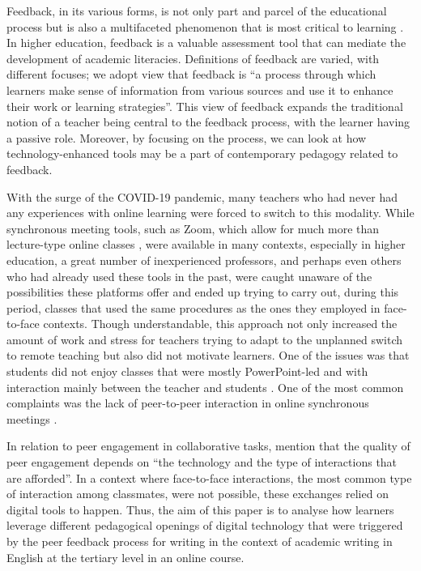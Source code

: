 \documentclass[english]{textolivre}
\begin{document}
Feedback, in its various forms, is not only part and parcel of the educational process but is also a multifaceted phenomenon that is most critical to learning \cite{hattie2007power}. In higher education, feedback is a valuable assessment tool that can mediate the development of academic literacies. Definitions of feedback are varied, with different focuses; we adopt \textcite[p. 1315]{carless2018development} view that feedback is “a process through which learners make sense of information from various sources and use it to enhance their work or learning strategies”. This view of feedback expands the traditional notion of a teacher being central to the feedback process, with the learner having a passive role. Moreover, by focusing on the process, we can look at how technology-enhanced tools may be a part of contemporary pedagogy related to feedback.

With the surge of the COVID-19 pandemic, many teachers who had never had any experiences with online learning were forced to switch to this modality. While synchronous meeting tools, such as Zoom, which allow for much more than lecture-type online classes \cite{kohnke2022facilitating}, were available in many contexts, especially in higher education, a great number of inexperienced professors, and perhaps even others who had already used these tools in the past, were caught unaware of the possibilities these platforms offer and ended up trying to carry out, during this period, classes that used the same procedures as the ones they employed in face-to-face contexts. Though understandable, this approach not only increased the amount of work and stress for teachers trying to adapt to the unplanned switch to remote teaching \cite{silus2020desafios} but also did not motivate learners. One of the issues was that students did not enjoy classes that were mostly PowerPoint-led and with interaction mainly between the teacher and students \cite{belda2021enhancing}. One of the most common complaints was the lack of peer-to-peer interaction in online synchronous meetings \cite{belda2021enhancing, co2020ensino}.

In relation to peer engagement in collaborative tasks, \textcite[p. 36]{willis2013sociocultural} mention that the quality of peer engagement depends on “the technology and the type of interactions that are afforded”. In a context where face-to-face interactions, the most common type of interaction among classmates, were not possible, these exchanges relied on digital tools to happen. Thus, the aim of this paper is to analyse how learners leverage different pedagogical openings of digital technology that were triggered by the peer feedback process for writing in the context of academic writing in English at the tertiary level in an online course.
\end{document}
